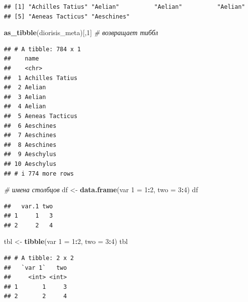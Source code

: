\documentclass[
]{book}
\newenvironment{Shaded}{\begin{snugshade}}{\end{snugshade}}
\newcommand{\AttributeTok}[1]{\textcolor[rgb]{0.13,0.29,0.53}{#1}}
\newcommand{\CommentTok}[1]{\textcolor[rgb]{0.56,0.35,0.01}{\textit{#1}}}
\newcommand{\DecValTok}[1]{\textcolor[rgb]{0.00,0.00,0.81}{#1}}
\newcommand{\FunctionTok}[1]{\textcolor[rgb]{0.13,0.29,0.53}{\textbf{#1}}}
\newcommand{\NormalTok}[1]{#1}
\newcommand{\OtherTok}[1]{\textcolor[rgb]{0.56,0.35,0.01}{#1}}
\newcommand{\SpecialCharTok}[1]{\textcolor[rgb]{0.81,0.36,0.00}{\textbf{#1}}}
\newcommand{\StringTok}[1]{\textcolor[rgb]{0.31,0.60,0.02}{#1}}
\theoremstyle{definition}
\theoremstyle{definition}
\theoremstyle{definition}
\theoremstyle{definition}
\theoremstyle{remark}
\begin{document}
\begin{verbatim}
## [1] "Achilles Tatius" "Aelian"          "Aelian"          "Aelian"         
## [5] "Aeneas Tacticus" "Aeschines"
\end{verbatim}

\begin{Shaded}
\begin{Highlighting}[]
\FunctionTok{as\_tibble}\NormalTok{(diorisis\_meta)[,}\DecValTok{1}\NormalTok{] }\CommentTok{\# возвращает тиббл}
\end{Highlighting}
\end{Shaded}

\begin{verbatim}
## # A tibble: 784 x 1
##    name           
##    <chr>          
##  1 Achilles Tatius
##  2 Aelian         
##  3 Aelian         
##  4 Aelian         
##  5 Aeneas Tacticus
##  6 Aeschines      
##  7 Aeschines      
##  8 Aeschines      
##  9 Aeschylus      
## 10 Aeschylus      
## # i 774 more rows
\end{verbatim}

\begin{Shaded}
\begin{Highlighting}[]
\CommentTok{\# имена столбцов}
\NormalTok{df }\OtherTok{\textless{}{-}} \FunctionTok{data.frame}\NormalTok{(}\StringTok{\textquotesingle{}var 1\textquotesingle{}} \OtherTok{=} \DecValTok{1}\SpecialCharTok{:}\DecValTok{2}\NormalTok{, }\AttributeTok{two =} \DecValTok{3}\SpecialCharTok{:}\DecValTok{4}\NormalTok{)}
\NormalTok{df}
\end{Highlighting}
\end{Shaded}

\begin{verbatim}
##   var.1 two
## 1     1   3
## 2     2   4
\end{verbatim}

\begin{Shaded}
\begin{Highlighting}[]
\NormalTok{tbl }\OtherTok{\textless{}{-}} \FunctionTok{tibble}\NormalTok{(}\StringTok{\textquotesingle{}var 1\textquotesingle{}} \OtherTok{=} \DecValTok{1}\SpecialCharTok{:}\DecValTok{2}\NormalTok{, }\AttributeTok{two =} \DecValTok{3}\SpecialCharTok{:}\DecValTok{4}\NormalTok{)}
\NormalTok{tbl}
\end{Highlighting}
\end{Shaded}

\begin{verbatim}
## # A tibble: 2 x 2
##   `var 1`   two
##     <int> <int>
## 1       1     3
## 2       2     4
\end{verbatim}
\end{document}
